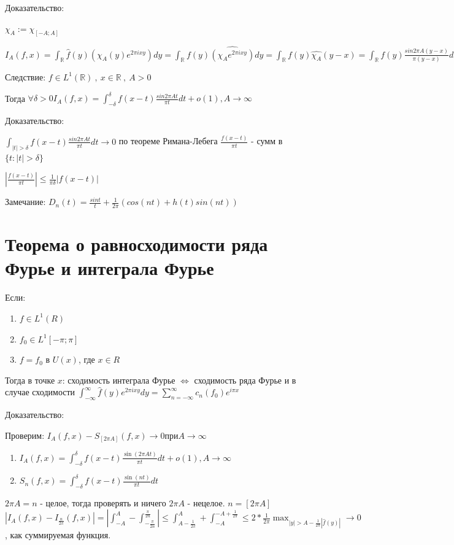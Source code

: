 \documentclass[paper=a4, fontsize=17pt]{article}
\begin{document}
Доказательство:

$\chi_{A} := \chi_{[-A; A]}$

$I_{A}(f, x)=\int_{\mathbb{R}}\widehat f(y)(\chi_{A}(y)e^{2\pi i x y})dy=\int_{\mathbb{R}}f(y)\widehat{(\chi_{A}e^{2\pi i x y})}dy = \int_{\mathbb{R}}f(y)\widehat{\chi_{A}}(y - x)=\int_{\mathbb{R}}f(y)\frac{sin 2\pi A (y - x)}{\pi (y - x)}dy$

Следствие: $f \in L^{1}(\mathbb{R}) \ , \ x \in \mathbb{R} \ , \ A > 0 $ 

Тогда $\forall \delta > 0 I_{A}(f, x) = \int_{-\delta}^{\delta}f(x - t)\frac{sin 2\pi A t}{\pi t}dt + o(1), A \rightarrow \infty$ 

Доказательство:

$\int_{|t| > \delta} f(x - t) \frac{sin 2 \pi A t}{\pi t}dt \rightarrow 0$ по теореме Римана-Лебега
$\frac{f(x - t)}{\pi t}$ - сумм в $\{t : |t| > \delta\}$ 

$| \frac{f(x - t)}{\pi t}| \leq \frac{1}{\pi \delta} |f(x - t)|$ 

Замечание: $D_{n}(t) = \frac{sin t}{t} + \frac{1}{2\pi}(cos(nt) + h(t) sin(nt)) $

\section{Теорема о равносходимости ряда Фурье и интеграла Фурье}

Если: 
\begin{enumerate}
	\item $f \in L^{1}(R)$
	\item $f_{0} \in L^{1}[-\pi; \pi]$
	\item $f = f_{0}$ в $U(x)$, где $x \in R$
\end{enumerate} 
Тогда в точке $x$: сходимость интеграла Фурье $\Leftrightarrow$ сходимость ряда Фурье и в случае сходимости $\int_{-\infty}^{\infty}\hat f(y)e^{2\pi i x y}dy=\sum_{n=-\infty}^{\infty}c_n(f_0)e^{i\pi x}$

Доказательство:

Проверим: $I_A(f,x) - S_{[2\pi A]}(f, x) \rightarrow 0 при A \rightarrow \infty$
\begin{enumerate}
	\item $I_A(f,x)=\int_{-\delta}^{\delta}f(x - t)\frac{\sin (2\pi A t)}{\pi t}dt + o(1), A\rightarrow\infty$
	\item $S_n(f,x)=\int_{-\delta}^{\delta}f(x - t)\frac{\sin(n t)}{\pi t}dt$
\end{enumerate}
$2 \pi A = n$ - целое, тогда проверять и ничего
$2 \pi A$ - нецелое. $n = [2\pi A]$
$|I_A(f,x) - I_{\frac{n}{2\pi}}(f,x)| = |\int_{-A}^{A} - \int_{-\frac{\pi}{2n}}^{\frac{\pi}{2n}}| \leq \int_{A - \frac{1}{2\pi}}^{A} + \int_{-A}^{-A + \frac{1}{2\pi}} \leq 2 * \frac{1}{2\pi} \max_{|y| > A - \frac{1}{2\pi}|\hat f(y)|} \rightarrow 0$, как суммируемая функция.
	
\end{document}
